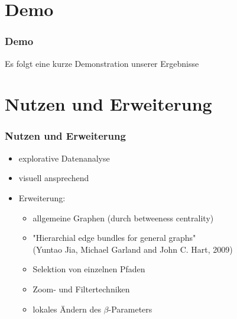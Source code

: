 \documentclass[11pt]{beamer}
\begin{document}
\section{Demo}
\begin{frame}
\frametitle{Demo}

Es folgt eine kurze Demonstration unserer Ergebnisse

\end{frame}


\section{Nutzen und Erweiterung}
\begin{frame}
\frametitle{Nutzen und Erweiterung}

\begin{itemize}
\item explorative Datenanalyse
\item visuell ansprechend
\item Erweiterung:
\begin{itemize} 
\item allgemeine Graphen (durch betweeness centrality)
\item "Hierarchial edge bundles for general graphs" 
\\(Yuntao Jia, Michael Garland and John C. Hart, 2009)
\item Selektion von einzelnen Pfaden
\item Zoom- und Filtertechniken
\item lokales Ändern des $\beta$-Parameters 
\end{itemize}
\end{itemize}

\end{frame}
\end{document}
